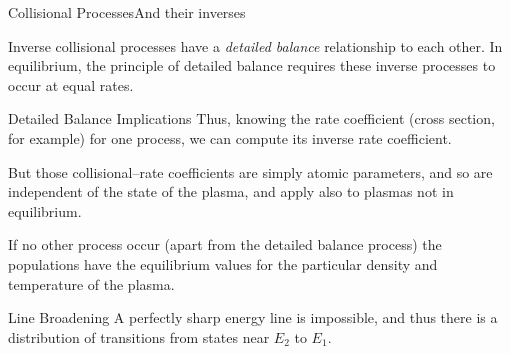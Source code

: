 \documentclass[]{beamer}
\begin{document}
\begin{frame}{Collisional Processes}{And their inverses}
  \begin{center}
\end{center}
Inverse collisional processes have a \emph{detailed balance} relationship to each other.
In equilibrium, the principle of detailed balance requires these inverse processes to occur at equal rates.

\end{frame}
\begin{frame}{Detailed Balance Implications}
Thus, knowing the rate coefficient (cross section, for example) for one process, we can compute its inverse rate coefficient.

But those collisional--rate coefficients are simply atomic parameters\footnotemark, and so are independent of the state of the plasma, and apply also to plasmas not in equilibrium.

If no other process occur (apart from the detailed balance process) the populations have the equilibrium values for the particular density and temperature of the plasma.
\end{frame}
\begin{frame}{Line Broadening}
A perfectly sharp energy line is impossible, and thus there is a distribution of transitions from states near $E_2$ to $E_1$.
\end{frame}
\end{document}
